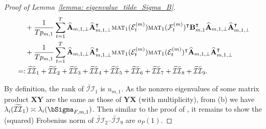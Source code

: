 \documentclass[aos]{imsart}
\theoremstyle{plain}
\theoremstyle{definition}
\def\mat{\textnormal{\textsc{mat}}}
\def\wt#1{\widetilde{#1}}
\def\wh#1{\widehat{#1}}
\def\cE{\mathcal{E}}
\def\cF{\mathcal{F}}
\def\cII{\mathcal{II}}
\def\bA{\mathbf{A}}
\def\bB{\mathbf{B}}
\def\bX{\mathbf{X}}
\def\bY{\mathbf{Y}}
\def\trans{\intercal}
\begin{document}
\begin{proof}[Proof of Lemma~\ref{lemma: eigenvalue_tilde_Sigma_B}]
\begin{align}
    &\;\quad
    + \frac{1}{Tp_{m,1}} \sum_{t=1}^T \wh{\bA}_{m,1,\perp} \wh{\bA}_{m,1,\perp}^\trans \mat_1(\cE_t^{(m)}) \mat_1(\cF_t^{(m)})^\trans \bB_{m,1}^\trans \wh{\bA}_{m,1,\perp} \wh{\bA}_{m,1,\perp}^\trans \notag \\
    &\;\quad
    + \frac{1}{Tp_{m,1}} \sum_{t=1}^T \wh{\bA}_{m,1,\perp} \wh{\bA}_{m,1,\perp}^\trans \mat_1(\cE_t^{(m)}) \mat_1(\cE_t^{(m)})^\trans \wh{\bA}_{m,1,\perp} \wh{\bA}_{m,1,\perp}^\trans \notag \\
    &=: \wt\cII_1 + \wt\cII_2 + \wt\cII_3 + \wt\cII_4 + \wt\cII_5 + \wt\cII_6 + \wt\cII_7 + \wt\cII_8 + \wt\cII_9 .
    \label{eqn: decomp_tilde_Sigma_B}
\end{align}


By definition, the rank of $\wt\cII_1$ is $u_{m,1}$. As the nonzero eigenvalues of some matrix product $\bX\bY$ are the same as those of $\bY\bX$ (with multiplicity), from (b) we have $\lambda_i(\wt\cII_1) \asymp \lambda_i(\bSigma_{F,m,1})$. Then similar to the proof of , it remains to show the (squared) Frobenius norm of $\wt\cII_2$--$\wt\cII_9$ are $o_P(1)$.


\end{proof}
\end{document}
